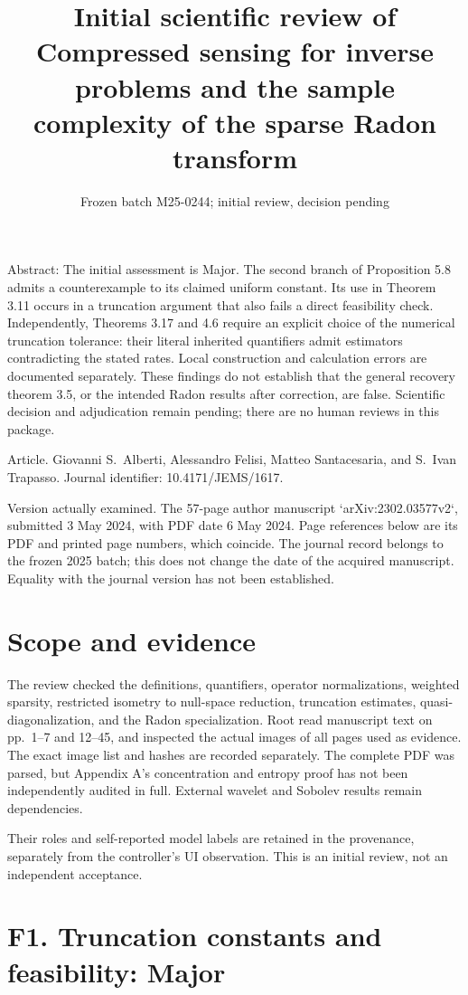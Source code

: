 \documentclass[10pt]{article}
\title{Initial scientific review of
Compressed sensing for inverse problems and the sample complexity of the sparse Radon transform}
\author{}
\date{Frozen batch M25-0244; initial review, decision pending}
\begin{document}
\maketitle
Abstract: The initial assessment is Major. The second branch of Proposition 5.8 admits a counterexample to its claimed uniform constant. Its use in Theorem 3.11 occurs in a truncation argument that also fails a direct feasibility check. Independently, Theorems 3.17 and 4.6 require an explicit choice of the numerical truncation tolerance: their literal inherited quantifiers admit estimators contradicting the stated rates. Local construction and calculation errors are documented separately. These findings do not establish that the general recovery theorem 3.5, or the intended Radon results after correction, are false. Scientific decision and adjudication remain pending; there are no human reviews in this package.\par
Article. Giovanni S. Alberti, Alessandro Felisi, Matteo Santacesaria, and S. Ivan Trapasso. Journal identifier: 10.4171/JEMS/1617.\par
Version actually examined. The 57-page author manuscript `arXiv:2302.03577v2`, submitted 3 May 2024, with PDF date 6 May 2024. Page references below are its PDF and printed page numbers, which coincide. The journal record belongs to the frozen 2025 batch; this does not change the date of the acquired manuscript. Equality with the journal version has not been established.\par
\section*{Scope and evidence}
The review checked the definitions, quantifiers, operator normalizations, weighted sparsity, restricted isometry to null-space reduction, truncation estimates, quasi-diagonalization, and the Radon specialization. Root read manuscript text on pp. 1–7 and 12–45, and inspected the actual images of all pages used as evidence. The exact image list and hashes are recorded separately. The complete PDF was parsed, but Appendix A’s concentration and entropy proof has not been independently audited in full. External wavelet and Sobolev results remain dependencies.\par
Their roles and self-reported model labels are retained in the provenance, separately from the controller’s UI observation. This is an initial review, not an independent acceptance.\par
\section*{F1. Truncation constants and feasibility: Major}
\end{document}
